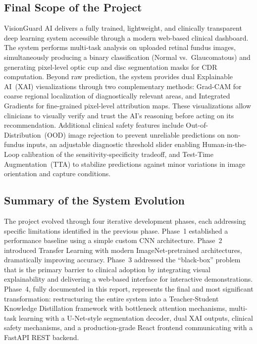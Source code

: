 \documentclass[conference]{IEEEtran}
\begin{document}
\subsection{Final Scope of the Project}
VisionGuard AI delivers a fully trained, lightweight, and clinically transparent deep learning system accessible through a modern web-based clinical dashboard. The system performs multi-task analysis on uploaded retinal fundus images, simultaneously producing a binary classification (Normal vs.\ Glaucomatous) and generating pixel-level optic cup and disc segmentation masks for CDR computation. Beyond raw prediction, the system provides dual Explainable AI~(XAI) visualizations through two complementary methods: Grad-CAM for coarse regional localization of diagnostically relevant areas, and Integrated Gradients for fine-grained pixel-level attribution maps. These visualizations allow clinicians to visually verify and trust the AI's reasoning before acting on its recommendation. Additional clinical safety features include Out-of-Distribution~(OOD) image rejection to prevent unreliable predictions on non-fundus inputs, an adjustable diagnostic threshold slider enabling Human-in-the-Loop calibration of the sensitivity-specificity tradeoff, and Test-Time Augmentation~(TTA) to stabilize predictions against minor variations in image orientation and capture conditions.

\subsection{Summary of the System Evolution}
The project evolved through four iterative development phases, each addressing specific limitations identified in the previous phase. Phase~1 established a performance baseline using a simple custom CNN architecture. Phase~2 introduced Transfer Learning with modern ImageNet-pretrained architectures, dramatically improving accuracy. Phase~3 addressed the ``black-box'' problem that is the primary barrier to clinical adoption by integrating visual explainability and delivering a web-based interface for interactive demonstrations. Phase~4, fully documented in this report, represents the final and most significant transformation: restructuring the entire system into a Teacher-Student Knowledge Distillation framework with bottleneck attention mechanisms, multi-task learning with a U-Net-style segmentation decoder, dual XAI outputs, clinical safety mechanisms, and a production-grade React frontend communicating with a FastAPI REST backend.
\end{document}
